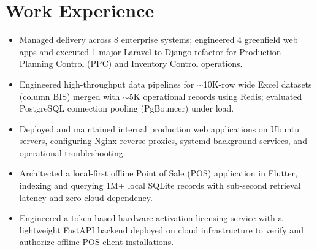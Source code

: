 \section{Work Experience}

\begin{itemize}
  \item Managed delivery across 8 enterprise systems; engineered 4 greenfield web apps and executed 1 major Laravel-to-Django refactor for Production Planning Control (PPC) and Inventory Control operations.
  \item Engineered high-throughput data pipelines for $\sim$10K-row wide Excel datasets (column BIS) merged with $\sim$5K operational records using Redis; evaluated PostgreSQL connection pooling (PgBouncer) under load.
  \item Deployed and maintained internal production web applications on Ubuntu servers, configuring Nginx reverse proxies, systemd background services, and operational troubleshooting.
\end{itemize}

\vspace{2pt plus 2pt minus 1pt}

\begin{itemize}
  \item Architected a local-first offline Point of Sale (POS) application in Flutter, indexing and querying 1M+ local SQLite records with sub-second retrieval latency and zero cloud dependency.
  \item Engineered a token-based hardware activation licensing service with a lightweight FastAPI backend deployed on cloud infrastructure to verify and authorize offline POS client installations.
\end{itemize}
